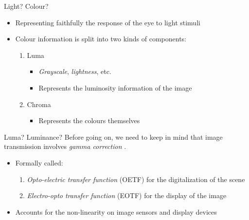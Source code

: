 \documentclass[aspectratio=169,usepdftitle=false]{fireshonks}
\begin{document}
\begin{frame}{Light? Colour?}
    \begin{itemize}
        \item Representing faithfully the response of the eye to light stimuli
        \item Colour information is split into two kinds of components:
              \begin{enumerate}
                  \item Luma
                        \begin{itemize}
                            \item \emph{Grayscale}, \emph{lightness}, etc.
                            \item Represents the luminosity information of the image
                        \end{itemize}
                  \item Chroma
                        \begin{itemize}
                            \item Represents the colours themselves
                        \end{itemize}
              \end{enumerate}
    \end{itemize}
\end{frame}
\begin{frame}{Luma? Luminance?}
    Before going on, we need to keep in mind that image transmission involves \emph{gamma correction} \autocite{tooms}.
    \begin{itemize}
        \item Formally called:
              \begin{enumerate}
                  \item \emph{Opto-electric transfer function} (OETF) for the digitalization of the scene
                  \item \emph{Electro-opto transfer function} (EOTF) for the display of the image
              \end{enumerate}
        \item Accounts for the non-linearity on image sensors and display devices
    \end{itemize}
\end{frame}
\end{document}
